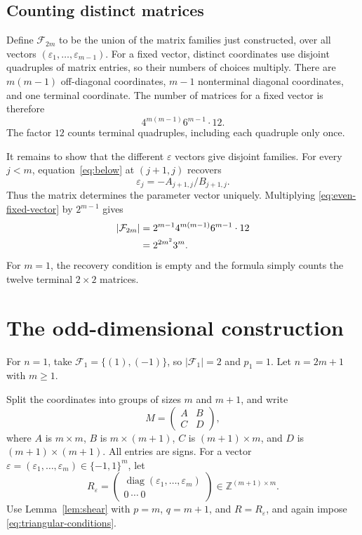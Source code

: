 \documentclass[11pt]{amsart}
\theoremstyle{definition}
\theoremstyle{remark}
\newcommand{\Z}{\mathbb Z}
\newcommand{\F}{\mathcal F}
\DeclareMathOperator{\diag}{diag}
\numberwithin{equation}{section}
\begin{document}
\subsection{Counting distinct matrices}

Define $\F_{2m}$ to be the union of the matrix families just constructed, over all vectors $(\varepsilon_1,\ldots,\varepsilon_{m-1})$. For a fixed vector, distinct coordinates use disjoint quadruples of matrix entries, so their numbers of choices multiply. There are $m(m-1)$ off-diagonal coordinates, $m-1$ nonterminal diagonal coordinates, and one terminal coordinate. The number of matrices for a fixed vector is therefore
\begin{equation}\label{eq:even-fixed-vector}
 4^{m(m-1)}6^{m-1}\cdot12.
\end{equation}
The factor $12$ counts terminal quadruples, including each quadruple only once.

It remains to show that the different $\varepsilon$ vectors give disjoint families. For every $j<m$, equation~\eqref{eq:below} at $(j+1,j)$ recovers
\begin{equation}\label{eq:even-recovery}
 \varepsilon_j=-A_{j+1,j}/B_{j+1,j}.
\end{equation}
Thus the matrix determines the parameter vector uniquely. Multiplying \eqref{eq:even-fixed-vector} by $2^{m-1}$ gives
\begin{align}
 |\F_{2m}|
 &=2^{m-1}4^{m(m-1)}6^{m-1}\cdot12\notag\\
 &=2^{2m^2}3^m.\label{eq:even-count}
\end{align}
For $m=1$, the recovery condition is empty and the formula simply counts the twelve terminal $2\times2$ matrices.

\section{The odd-dimensional construction}\label{sec:odd}

For $n=1$, take $\F_1=\{(1),(-1)\}$, so $|\F_1|=2$ and $p_1=1$. Let $n=2m+1$ with $m\geq1$.

Split the coordinates into groups of sizes $m$ and $m+1$, and write
\[
 M=\begin{pmatrix}A&B\\ C&D\end{pmatrix},
\]
where $A$ is $m\times m$, $B$ is $m\times(m+1)$, $C$ is $(m+1)\times m$, and $D$ is $(m+1)\times(m+1)$. All entries are signs. For a vector $\varepsilon=(\varepsilon_1,\ldots,\varepsilon_m)\in\{-1,1\}^m$, let
\begin{equation}\label{eq:odd-R}
 R_\varepsilon=
 \begin{pmatrix}\diag(\varepsilon_1,\ldots,\varepsilon_m)\\0\ \cdots\ 0\end{pmatrix}
 \in\Z^{(m+1)\times m}.
\end{equation}
Use Lemma~\ref{lem:shear} with $p=m$, $q=m+1$, and $R=R_\varepsilon$, and again impose \eqref{eq:triangular-conditions}.
\end{document}
